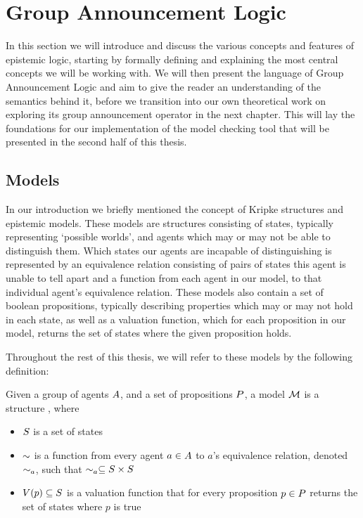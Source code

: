 \section{Group Announcement Logic}\label{sec:theory}

In this section we will introduce and discuss the various concepts and features of epistemic logic, starting by formally defining and explaining the most central concepts we will be working with. We will then present the language of Group Announcement Logic and aim to give the reader an understanding of the semantics behind it, before we transition into our own theoretical work on exploring its group announcement operator in the next chapter. This will lay the foundations for our implementation of the model checking tool that will be presented in the second half of this thesis.

\subsection{Models}

In our introduction we briefly mentioned the concept of Kripke structures and epistemic models. These models are structures consisting of states, typically representing `possible worlds', and agents which may or may not be able to distinguish them. Which states our agents are incapable of distinguishing is represented by an equivalence relation consisting of pairs of states this agent is unable to tell apart and a function from each agent in our model, to that individual agent's equivalence relation. These models also contain a set of boolean propositions, typically describing properties which may or may not hold in each state, as well as a valuation function, which for each proposition in our model, returns the set of states where the given proposition holds.

Throughout the rest of this thesis, we will refer to these models by the following definition: 

\begin{definition}[Models]\label{def:model}
	Given a group of agents $A$, and a set of propositions $P$, a model $\mathcal{M}$ is a structure \model{}, where
	\begin{itemize}
		\item $S$ is a set of states
		\item $\sim$ is a function from every agent $a \in A$ to $a$'s equivalence relation, denoted $\sim_a$, such that $\sim_a \subseteq S\times S$
		\item $V(p)\subseteq S$ is a valuation function that for every proposition $p \in P$ returns the set of states where $p$ is true
	\end{itemize}
\end{definition}

